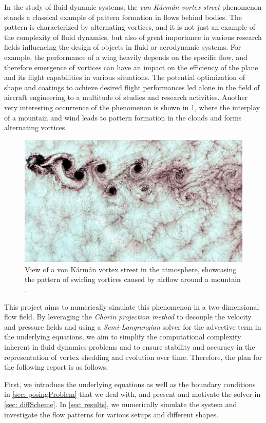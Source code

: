 In the study of fluid dynamic systems, the \textit{von Kármán vortex street} phenomenon stands a classical example of pattern formation in flows behind bodies. The pattern is characterized by alternating vortices, and it is not just an example of the complexity of fluid dynamics, but also of great importance in various research fields influencing the design of objects in fluid or aerodynamic systems. For example, the performance of a wing heavily depends on the specific flow, and therefore emergence of vortices can have an impact on the efficiency of the plane and its flight capabilities in various situations. The potential optimization of shape and coatings to achieve desired flight performances led alone in the field of aircraft engineering to a multitude of studies and research activities. Another very interesting occurrence of the phenomenon is shown in \cref{fig: example vortices}, where the interplay of a mountain and wind leads to pattern formation in the clouds and forms alternating vortices. 

\begin{figure}[!htb]
        \centering
        \includegraphics[width=0.6\linewidth]{0_graphics/example_atmos.png}
        \caption{View of a von Kármán vortex street in the atmosphere, showcasing the pattern of swirling vortices caused by airflow around a mountain \cite{wiki}.}
        \label{fig: example vortices}
\end{figure}

This project aims to numerically simulate this phenomenon in a two-dimensional flow field. By leveraging the \textit{Chorin projection method} to decouple the velocity and pressure fields and using a \textit{Semi-Langrangian} solver for the advective term in the underlying equations, we aim to simplify the computational complexity inherent in fluid dynamics problems and to ensure stability and accuracy in the representation of vortex shedding and evolution over time.
Therefore, the plan for the following report is as follows.

First, we introduce the underlying equations as well as the boundary conditions in \cref{sec: posingProblem} that we deal with, and present and motivate the solver in \cref{sec: diffScheme}. In \cref{sec: results}, we numerically simulate the system and investigate the flow patterns for various setups and different shapes.